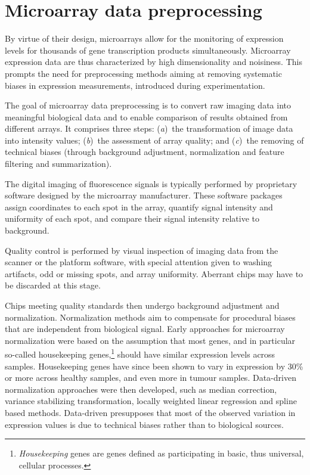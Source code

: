 \section{Microarray data preprocessing}
\label{sec:microarray-methods-data-preprocessing}

By virtue of their design, microarrays allow for the monitoring of expression
levels for thousands of gene transcription products simultaneously.  Microarray
expression data are thus characterized by high dimensionality and noisiness.
This prompts the need for preprocessing methods aiming at removing systematic
biases in expression measurements, introduced during
experimentation.\cite{shakya_comparison_2010}

The goal of microarray data preprocessing is to convert raw imaging data into
meaningful biological data and to enable comparison of results obtained from
different arrays.  It comprises three steps: (\emph{a})~the transformation of
image data into intensity values; (\emph{b})~the assessment of array quality;
and (\emph{c})~the removing of technical biases (through background adjustment,
normalization and feature filtering and summarization).

The digital imaging of fluorescence signals is typically performed by
proprietary software designed by the microarray manufacturer.  These software
packages assign coordinates to each spot in the array, quantify signal intensity
and uniformity of each spot, and compare their signal intensity relative to
background.

Quality control is performed by visual inspection of imaging data from the
scanner or the platform software, with special attention given to washing
artifacts, odd or missing spots, and array uniformity.  Aberrant chips may have
to be discarded at this stage.

Chips meeting quality standards then undergo background adjustment and
normalization.  Normalization methods aim to compensate for procedural biases
that are independent from biological signal.  Early approaches for microarray
normalization were based on the assumption that most genes, and in particular
so-called housekeeping genes,\footnote{\emph{Housekeeping} genes are genes
  defined as participating in basic, thus universal, cellular processes.}
should have similar expression levels across samples.  Housekeeping genes have
since been shown to vary in expression by 30\% or more across healthy samples,
and even more in tumour samples.\cite{lee_control_2002,eisenberg_human_2003}
Data-driven normalization approaches were then developed, such as median
correction,\cite{cho_genome-wide_1998,selinger_rna_2000} variance stabilizing
transformation,\cite{durbin_variance-stabilizing_2002} locally weighted linear
regression\cite{yang_normalization_2002} and spline based
methods.\cite{workman_new_2002} Data-driven presupposes that most of the
observed variation in expression values is due to technical biases rather than
to biological sources.\cite{hicks_when_2014}

